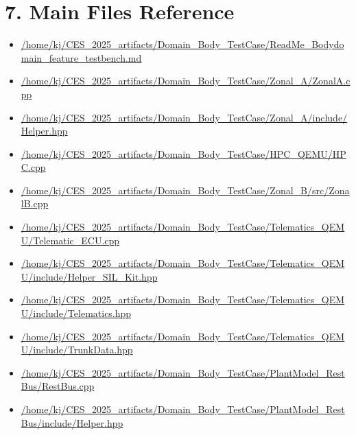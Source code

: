 \documentclass[11pt,a4paper]{article}
\begin{document}
\section*{7. Main Files Reference}
\begin{itemize}
  \item \url{/home/kj/CES_2025_artifacts/Domain_Body_TestCase/ReadMe_Bodydomain_feature_testbench.md}
  \item \url{/home/kj/CES_2025_artifacts/Domain_Body_TestCase/Zonal_A/ZonalA.cpp}
  \item \url{/home/kj/CES_2025_artifacts/Domain_Body_TestCase/Zonal_A/include/Helper.hpp}
  \item \url{/home/kj/CES_2025_artifacts/Domain_Body_TestCase/HPC_QEMU/HPC.cpp}
  \item \url{/home/kj/CES_2025_artifacts/Domain_Body_TestCase/Zonal_B/src/ZonalB.cpp}
  \item \url{/home/kj/CES_2025_artifacts/Domain_Body_TestCase/Telematics_QEMU/Telematic_ECU.cpp}
  \item \url{/home/kj/CES_2025_artifacts/Domain_Body_TestCase/Telematics_QEMU/include/Helper_SIL_Kit.hpp}
  \item \url{/home/kj/CES_2025_artifacts/Domain_Body_TestCase/Telematics_QEMU/include/Telematics.hpp}
  \item \url{/home/kj/CES_2025_artifacts/Domain_Body_TestCase/Telematics_QEMU/include/TrunkData.hpp}
  \item \url{/home/kj/CES_2025_artifacts/Domain_Body_TestCase/PlantModel_RestBus/RestBus.cpp}
  \item \url{/home/kj/CES_2025_artifacts/Domain_Body_TestCase/PlantModel_RestBus/include/Helper.hpp}
\end{itemize}
\end{document}
